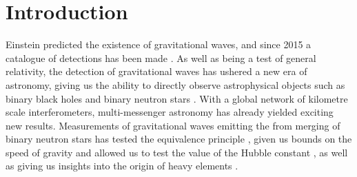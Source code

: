 \section{Introduction}
Einstein predicted the existence of gravitational waves, and since 2015 a catalogue of detections has been made \cite{Collaboration2018}. As well as being a test of general relativity, the detection of gravitational waves has ushered a new era of astronomy, giving us the ability to directly observe astrophysical objects such as binary black holes and binary neutron stars \cite{Abbott2017a}. With a global network of kilometre scale interferometers, multi-messenger astronomy has already yielded exciting new results. Measurements of gravitational waves emitting the from  merging of binary neutron stars has tested the equivalence principle \cite{Abbott2017c}, given us bounds on the speed of gravity and allowed us to test the value of the Hubble constant \cite{Abbott2017d}, as well as giving us insights into the origin of heavy elements \cite{Kasen2017}.
